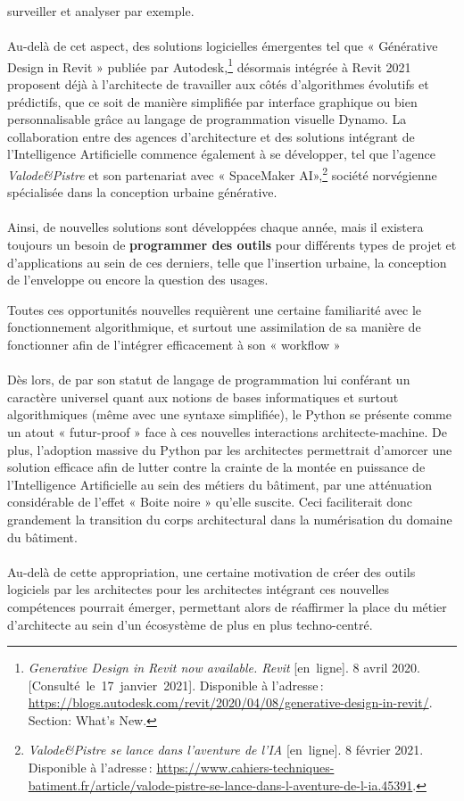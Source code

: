 \documentclass[
  11pt,
  french,
]{article}
\begin{document}
surveiller et analyser par exemple.\\
~\\
Au-delà de cet aspect, des solutions logicielles émergentes tel que «
Générative Design in Revit » publiée par Autodesk,\footnote{\emph{Generative
  Design in Revit now available. Revit} {[}en~ligne{]}. 8 avril 2020.
  {[}Consulté~le~17~janvier~2021{]}. Disponible à l'adresse\,:
  \url{https://blogs.autodesk.com/revit/2020/04/08/generative-design-in-revit/}.
  Section: What's New.} désormais intégrée à Revit 2021 proposent déjà à
l'architecte de travailler aux côtés d'algorithmes évolutifs et
prédictifs, que ce soit de manière simplifiée par interface graphique ou
bien personnalisable grâce au langage de programmation visuelle Dynamo.
La collaboration entre des agences d'architecture et des solutions
intégrant de l'Intelligence Artificielle commence également à se
développer, tel que l'agence \emph{Valode\&Pistre} et son partenariat
avec « SpaceMaker AI»,\footnote{\emph{Valode\&Pistre se lance dans
  l'aventure de l'IA} {[}en~ligne{]}. 8 février 2021. Disponible à
  l'adresse\,:
  \url{https://www.cahiers-techniques-batiment.fr/article/valode-pistre-se-lance-dans-l-aventure-de-l-ia.45391}.}
société norvégienne spécialisée dans la conception urbaine générative.\\
~\\
Ainsi, de nouvelles solutions sont développées chaque année, mais il
existera toujours un besoin de \textbf{programmer des outils} pour
différents types de projet et d'applications au sein de ces derniers,
telle que l'insertion urbaine, la conception de l'enveloppe ou encore la
question des usages.

\hfill\break
\hfill\break
Toutes ces opportunités nouvelles requièrent une certaine familiarité
avec le fonctionnement algorithmique, et surtout une assimilation de sa
manière de fonctionner afin de l'intégrer efficacement à son « workflow
»\\
~\\
Dès lors, de par son statut de langage de programmation lui conférant un
caractère universel quant aux notions de bases informatiques et surtout
algorithmiques (même avec une syntaxe simplifiée), le Python se présente
comme un atout « futur-proof » face à ces nouvelles interactions
architecte-machine. De plus, l'adoption massive du Python par les
architectes permettrait d'amorcer une solution efficace afin de lutter
contre la crainte de la montée en puissance de l'Intelligence
Artificielle au sein des métiers du bâtiment, par une atténuation
considérable de l'effet « Boite noire » qu'elle suscite. Ceci
faciliterait donc grandement la transition du corps architectural dans
la numérisation du domaine du bâtiment.\\
~\\
Au-delà de cette appropriation, une certaine motivation de créer des
outils logiciels par les architectes pour les architectes intégrant ces
nouvelles compétences pourrait émerger, permettant alors de réaffirmer
la place du métier d'architecte au sein d'un écosystème de plus en plus
techno-centré.
\end{document}
